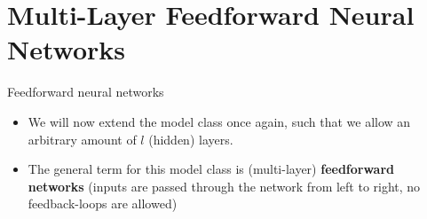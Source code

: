 \section{Multi-Layer Feedforward Neural Networks}

\begin{vbframe}{Feedforward neural networks}
  \begin{itemize}
    \vspace{15mm}
    \item We will now extend the model class once again, such that we allow an arbitrary amount of $l$ (hidden) layers.
    \vspace{5mm}
    \item The general term for this model class is (multi-layer) \textbf{feedforward networks} (inputs are passed through the network from left to right, no feedback-loops are allowed)
  \end{itemize}
\framebreak
  \begin{itemize}

\end{itemize}
\end{vbframe}
